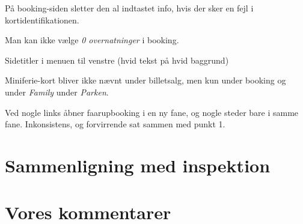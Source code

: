 \documentclass[10pt,a4paper]{article}      %
\begin{document}
På booking-siden sletter den al indtastet info, hvis der sker en fejl i
kortidentifikationen.

Man kan ikke vælge \emph{0 overnatninger} i booking.

Sidetitler i menuen til venstre (hvid tekst på hvid baggrund)

Miniferie-kort bliver ikke nævnt under billetsalg, men kun under booking og
under \emph{Family} under \emph{Parken}.

Ved nogle links åbner faarupbooking i en ny fane, og nogle steder bare i samme
fane. Inkonsistens, og forvirrende sat sammen med punkt 1.

\section{Sammenligning med inspektion}
\label{apx:sammenligning-inspektion}

\section{Vores kommentarer}
\label{apx:vores-kommentarer}
\end{document}
